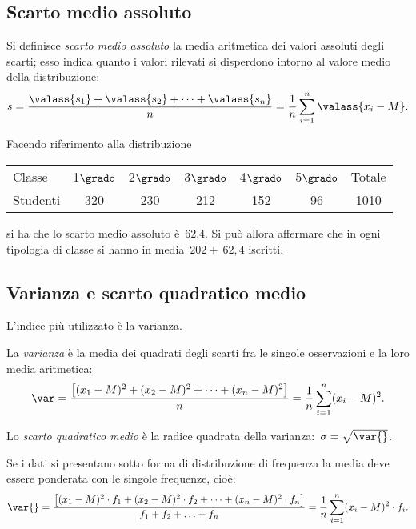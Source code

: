 \subsection{Scarto medio assoluto}
\label{subsec:stat02_scarto_assoluto}

\begin{definizione}
Si definisce \emph{scarto medio assoluto} la media aritmetica dei valori 
assoluti degli scarti; esso indica quanto i valori rilevati si disperdono
intorno al valore medio della distribuzione:
\[s=\frac{\valass{s_1}+\valass{s_2}+ \cdots +\valass{s_n}}{n}=\frac 
{1}{n}\sum_{i=1}^n \valass{x_i - M}.\]
\end{definizione}

Facendo riferimento alla distribuzione
\begin{center}
\begin{tabular}{lcccccc}
\toprule
 Classe & 1\(\grado\) & 2\(\grado\) & 3\(\grado\) & 4\(\grado\) & 5\(\grado\) & 
Totale\\
 Studenti & 320 & 230 & 212 & 152 & 96 & 1010 \\
\bottomrule
\end{tabular}
\end{center}
si ha che lo scarto medio assoluto è~62,4. Si può allora affermare che in 
ogni tipologia di classe si hanno in media~\(202\pm~62,4\) iscritti.

\subsection{Varianza e scarto quadratico medio}
\label{subsec:stat02_scarto_quadratico}

L'indice più utilizzato è la varianza.

\begin{definizione}
La \emph{varianza} è la media dei quadrati degli scarti fra le singole 
osservazioni e la loro media
aritmetica:
\[\var=\frac{ \left[ (x_1-M)^2+(x_2-M)^2+ \cdots +(x_n-M)^2 \right] 
}{n}=\frac{1}{n}\sum_{i=1}^n (x_i-M)^2.\]

Lo \emph{scarto quadratico medio} è la radice quadrata della 
varianza:~\(\sigma=\sqrt{\var{}}\).
\end{definizione}

Se i dati si presentano sotto forma di distribuzione di frequenza la media 
deve essere ponderata con le singole
frequenze, cioè:
\begin{equation*}
\var{}=\frac{\left[(x_1-M)^2\cdot f_1+(x_2-M)^2\cdot f_2+ \cdots 
+(x_n-M)^2\cdot f_n \right]}{f_1+f_2+\ldots+f_n}=\frac 
{1}{n}\sum_{i=1}^n(x_i-M)^2\cdot f_i.
\end{equation*}

